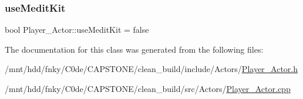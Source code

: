\mbox{\label{classPlayer__Actor_ab6793edf4da7028fcb021be5cf9f6388}} 
\subsubsection{\texorpdfstring{use\+Medit\+Kit}{useMeditKit}}
{\footnotesize\ttfamily bool Player\+\_\+\+Actor\+::use\+Medit\+Kit = false\hspace{0.3cm}{\ttfamily [private]}}



The documentation for this class was generated from the following files\+:\begin{DoxyCompactItemize}
\item 
/mnt/hdd/fnky/\+C0de/\+C\+A\+P\+S\+T\+O\+N\+E/clean\+\_\+build/include/\+Actors/\hyperlink{Player__Actor_8h}{Player\+\_\+\+Actor.\+h}\item 
/mnt/hdd/fnky/\+C0de/\+C\+A\+P\+S\+T\+O\+N\+E/clean\+\_\+build/src/\+Actors/\hyperlink{Player__Actor_8cpp}{Player\+\_\+\+Actor.\+cpp}\end{DoxyCompactItemize}
